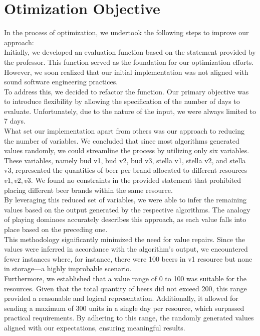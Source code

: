 \newpage

\section{Otimization Objective}


\quad In the process of optimization, we undertook the following steps to improve our approach:\\


Initially, we developed an evaluation function based on the statement provided by the professor. This function served as the foundation for our optimization efforts. However, we soon realized that our initial implementation was not aligned with sound software engineering practices.\\


To address this, we decided to refactor the function. Our primary objective was to introduce flexibility by allowing the specification of the number of days to evaluate. Unfortunately, due to the nature of the input, we were always limited to 7 days.\\


What set our implementation apart from others was our approach to reducing the number of variables. We concluded that since most algorithms generated values randomly, we could streamline the process by utilizing only six variables. These variables, namely bud v1, bud v2, bud v3, stella v1, stella v2, and stella v3, represented the quantities of beer per brand allocated to different resources \(v1, v2, v3\). We found no constraints in the provided statement that prohibited placing different beer brands within the same resource.\\


By leveraging this reduced set of variables, we were able to infer the remaining values based on the output generated by the respective algorithms. The analogy of playing dominoes accurately describes this approach, as each value falls into place based on the preceding one.\\


This methodology significantly minimized the need for value repairs. 
Since the values were inferred in accordance with the algorithm's output, we encountered fewer instances where, for instance, there were 100 beers in v1 resource but none in storage—a highly improbable scenario.\\


Furthermore, we established that a value range of 0 to 100 was suitable for the resources. Given that the total quantity of beers did not exceed 200, this range provided a reasonable and logical representation. Additionally, it allowed for sending a maximum of 300 units in a single day per resource, which surpassed practical requirements. By adhering to this range, the randomly generated values aligned with our expectations, ensuring meaningful results.\\


